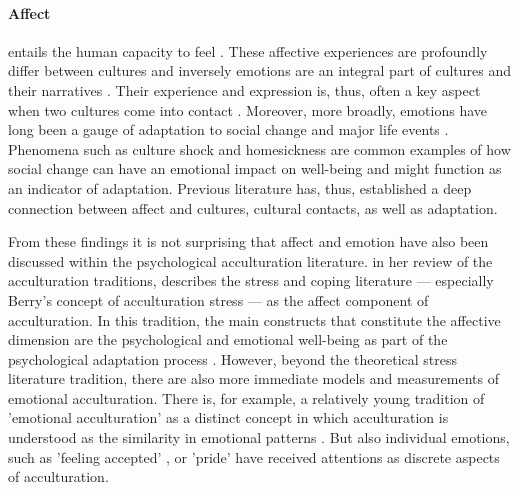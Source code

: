 \documentclass[nobib]{tufte-handout}
\begin{document}
\paragraph{Affect}entails the human capacity to feel \citep[including emotions and moods;][]{FeldmanBarrett2007}. These affective experiences are profoundly differ between cultures \citep[e.g.,][]{Holodynski2012, Boiger2018} and inversely emotions are an integral part of cultures and their narratives \citep{Ahmed2014, Kitayama1994, Smith2016c, Sundararajan2015}. Their experience and expression is, thus, often a key aspect when two cultures come into contact \citep[e.g.,][]{Iyer2008, Stephan1992}. Moreover, more broadly, emotions have long been a gauge of adaptation to social change and major life events \citep[e.g.,][]{Smith1990, Pacella2017}. Phenomena such as culture shock \citep{Ward2001a} and homesickness \citep{VanTilburg1996} are common examples of how social change can have an emotional impact on well-being and might function as an indicator of adaptation. Previous literature has, thus, established a deep connection between affect and cultures, cultural contacts, as well as adaptation.

From these findings it is not surprising that affect and emotion have also been discussed within the psychological acculturation literature. \citet{Ward2001} in her review of the acculturation traditions, describes the stress and coping literature --- especially Berry's concept of acculturation stress \citep{Berry1997b} --- as the affect component of acculturation. In this tradition, the main constructs that constitute the affective dimension are the psychological and emotional well-being as part of the psychological adaptation process \citep[including, for example life satisfaction and depression][]{Ward2019}. However, beyond the theoretical stress literature tradition, there are also more immediate models and measurements of emotional acculturation. There is, for example, a relatively young tradition of 'emotional acculturation' as a distinct concept in which acculturation is understood as the similarity in emotional patterns \citep[see][for a review]{DeLeersnyder2017}. But also individual emotions, such as 'feeling accepted' \citep{Jasini2018}, or 'pride' \citep{Suinn1995} have received attentions as discrete aspects of acculturation. 
\end{document}
